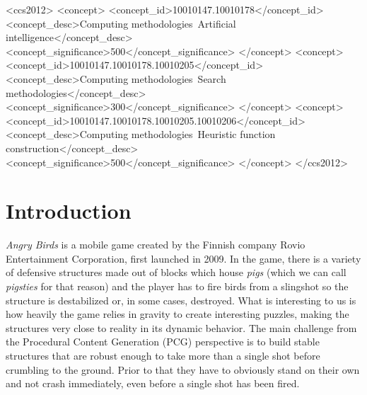 \documentclass[sigconf]{acmart}
\begin{document}
%
%


 \begin{CCSXML}
<ccs2012>
<concept>
<concept_id>10010147.10010178</concept_id>
<concept_desc>Computing methodologies~Artificial intelligence</concept_desc>
<concept_significance>500</concept_significance>
</concept>
<concept>
<concept_id>10010147.10010178.10010205</concept_id>
<concept_desc>Computing methodologies~Search methodologies</concept_desc>
<concept_significance>300</concept_significance>
</concept>
<concept>
<concept_id>10010147.10010178.10010205.10010206</concept_id>
<concept_desc>Computing methodologies~Heuristic function construction</concept_desc>
<concept_significance>500</concept_significance>
</concept>
</ccs2012>
\end{CCSXML}




\maketitle

%
%
\section{Introduction}
\label{sec:intro}

\textit{Angry Birds} is a mobile game created by the Finnish company Rovio Entertainment 
Corporation\cite{angry-birds}, first launched in 2009. 
In the game, there is a variety of defensive structures made out of
blocks which house {\em pigs} (which we can call {\em pigsties} for
that reason)
and the player has to fire birds from a slingshot
so the structure is destabilized or, in some cases, destroyed.
What is interesting to us is how heavily the 
game relies in gravity to create interesting puzzles, making the
structures very close to reality in its dynamic behavior. The main challenge 
from 
the Procedural Content Generation (PCG) perspective is to build stable
structures that are robust enough to take more than a single shot
before crumbling to the ground. Prior to that they have to obviously
stand on their own and not crash immediately, even before a single
shot has been fired.
\end{document}
